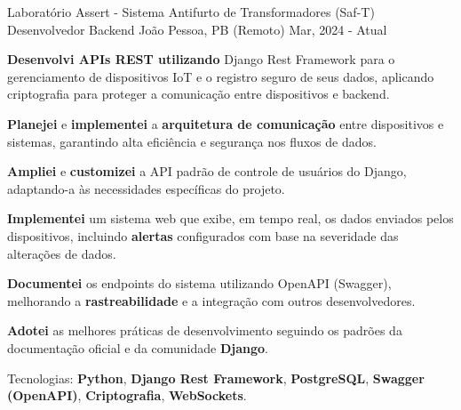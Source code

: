 
\begin{cventries}
  \cventry
  {Laboratório Assert - Sistema Antifurto de Transformadores (Saf-T)} %
  {Desenvolvedor Backend} %
  {João Pessoa, PB (Remoto)} %
  {Mar, 2024 - Atual} %
  {
    \begin{cvitems}
      \item {\textbf{Desenvolvi APIs REST utilizando} {Django Rest Framework} para o gerenciamento de dispositivos  {IoT} e o registro seguro de seus dados, aplicando  {criptografia} para proteger a comunicação entre dispositivos e backend.}
      \item {\textbf{Planejei} e \textbf{implementei} a \textbf{arquitetura de comunicação} entre dispositivos e sistemas, garantindo alta eficiência e segurança nos fluxos de dados.}
      \item {\textbf{Ampliei} e \textbf{customizei} a API padrão de controle de usuários do {Django}, adaptando-a às necessidades específicas do projeto.}
      \item {\textbf{Implementei} um sistema web que exibe, em tempo real, os dados enviados pelos dispositivos, incluindo \textbf{alertas} configurados com base na severidade das alterações de dados.}
      \item {\textbf{Documentei} os endpoints do sistema utilizando  {OpenAPI (Swagger)}, melhorando a \textbf{rastreabilidade} e a integração com outros desenvolvedores.}
      \item {\textbf{Adotei} as melhores práticas de desenvolvimento seguindo os padrões da documentação oficial e da comunidade \textbf{Django}.}
      \item {Tecnologias: \textbf{Python}, \textbf{Django Rest Framework}, \textbf{PostgreSQL}, \textbf{Swagger (OpenAPI)}, \textbf{Criptografia}, \textbf{WebSockets}.}
    \end{cvitems}
  }


\end{cventries}
